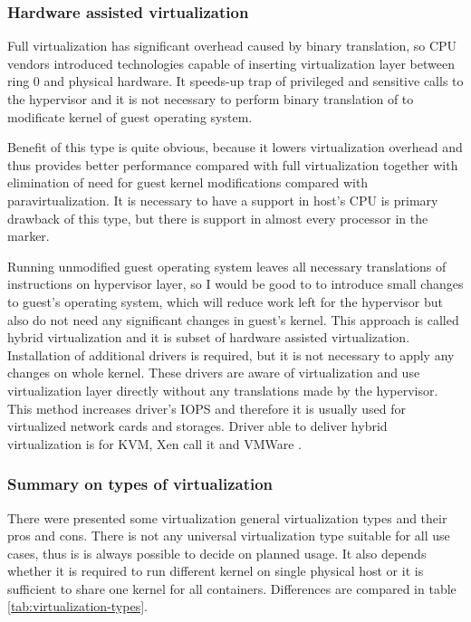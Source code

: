 \subsubsection{Hardware assisted virtualization}
Full virtualization has significant overhead caused by binary translation, so \Ac{CPU} vendors introduced technologies capable of inserting virtualization layer between ring 0 and physical hardware. It speeds-up trap of privileged and sensitive calls to the hypervisor and it is not necessary to perform binary translation of to modificate kernel of guest operating system. 

Benefit of this type is quite obvious, because it lowers virtualization overhead and thus provides better performance compared with full virtualization together with elimination of need for guest kernel modifications compared with paravirtualization. It is necessary to have a support in host's \Ac{CPU} is primary drawback of this type, but there is support in almost every processor in the marker.

Running unmodified guest operating system leaves all necessary translations of instructions on hypervisor layer, so I would be good to to introduce small changes to guest's operating system, which will reduce work left for the hypervisor but also do not need any significant changes in guest's kernel. This approach is called hybrid virtualization and it is subset of hardware assisted virtualization. Installation of additional drivers is required, but it is not necessary to apply any changes on whole kernel. These drivers are aware of virtualization and use virtualization layer directly without any translations made by the hypervisor. This method increases driver's \Ac{IOPS} and therefore it is usually used for virtualized network cards and storages. Driver able to deliver hybrid virtualization is  for \Ac{KVM}, Xen call it  and VMWare  .

\subsubsection{Summary on types of virtualization}
There were presented some virtualization general virtualization types and their pros and cons. There is not any universal virtualization type suitable for all use cases, thus is is always possible to decide on planned usage. It also depends whether it is required to run different kernel on single physical host or it is sufficient to share one kernel for all containers. Differences are compared in table \ref{tab:virtualization-types}.

